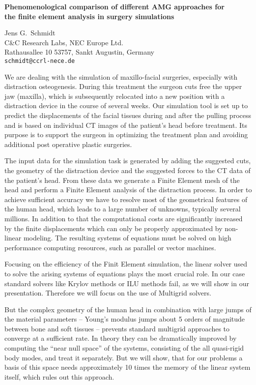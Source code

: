 \documentclass{report}
\begin{document}

\begin{center}
{\large
{\bf Phenomenological comparison of different AMG approaches for \\
	the finite element analysis in surgery simulations}}

	Jens G.~Schmidt \\
	C\&C Research Labs, NEC Europe Ltd. \\
	Rathausallee 10 53757, Sankt Augustin, Germany \\
	{\tt schmidt@ccrl-nece.de}
\end{center}
We are dealing with the simulation of maxillo-facial
surgeries, especially with distraction osteogenesis. During
this treatment the surgeon cuts free the upper jaw
(maxilla), which is subsequently relocated into a new
position with a distraction device in the course of several
weeks. Our simulation tool is set up to predict the
displacements of the facial tissues during and after the
pulling process and is based on individual CT images of the
patient's head before treatment. Its purpose is to support
the surgeon in optimizing the treatment plan and avoiding
additional post operative plastic surgeries.

The input
data for the simulation task is generated by adding the
suggested cuts, the geometry of the distraction device and
the suggested forces to the CT data of the patient's head.
From these data we generate a Finite Element mesh of the
head and perform a Finite Element analysis of the
distraction process. In order to achieve sufficient accuracy
we have to resolve most of the geometrical features of the
human head, which leads to a large number of unknowns,
typically several millions. In addition to that the
computational costs are significantly increased by the
finite displacements which can only be properly approximated
by non-linear modeling. The resulting systems of equations
must be solved on high performance computing resources, such
as parallel or vector machines.

Focusing on the
efficiency of the Finit Element simulation, the linear
solver used to solve the arising systems of equations plays
the most crucial role. In our case standard solvers like
Krylov methods or ILU methods fail, as we will show in our
presentation. Therefore we will focus on the use of
Multigrid solvers.

But the complex geometry of the human
head in combination with large jumps of the material
parameters -- Young's modulus jumps about 5 orders of
magnitude between bone and soft tissues -- prevents standard
multigrid approaches to converge at a sufficient rate. In
theory they can be dramatically improved by computing the
``near null space'' of the systems, consisting of the all
quasi-rigid body modes, and treat it separately. But we will
show, that for our problems a basis of this space needs
approximately 10 times the memory of the linear system
itself, which rules out this approach.
\end{document}
